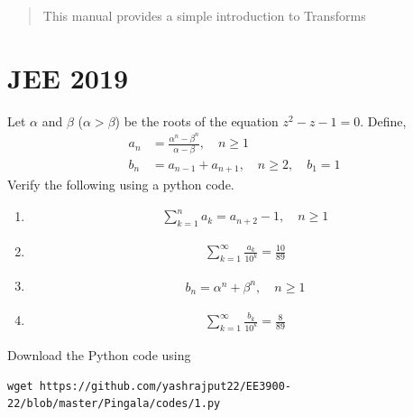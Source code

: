\documentclass[journal,12pt,twocolumn]{IEEEtran}
\renewcommand\thesection{\arabic{section}}
\begin{document}
% 







\maketitle


\tableofcontents

\bigskip

\begin{abstract}
This manual provides a simple introduction to Transforms
\end{abstract}
\section{JEE 2019}
\noindent Let $\alpha$ and $\beta$ ($\alpha > \beta$) be the roots of the
equation $z^2 - z - 1 = 0$. Define,
\begin{align}
	a_n &= \frac{\alpha^{n}-\beta^{n}}{\alpha - \beta}, \quad n \ge 1
	\\
	b_n &= a_{n-1} + a_{n+1}, \quad n \ge 2, \quad b_1 =1
	\label{eq:10-orig-diff}
\end{align}
Verify the following using a python code.
\begin{enumerate}[label=\thesection.\arabic*
,ref=\thesection.\theenumi]
\item 
\begin{align}
	\sum_{k=1}^{n}a_k = a_{n+2}-1, \quad n \ge 1
\end{align}
 \item 
\begin{align}
	\sum_{k=1}^{\infty}\frac{a_k}{10^k} =\frac{10}{89}
\end{align}
 \item 
\begin{align}
	b_n =\alpha^n + \beta^n, \quad n \ge 1
\end{align}
 \item 
\begin{align}
	\sum_{k=1}^{\infty}\frac{b_k}{10^k} =\frac{8}{89}
\end{align}
\end{enumerate}
Download the Python code using
\begin{lstlisting}
wget https://github.com/yashrajput22/EE3900-22/blob/master/Pingala/codes/1.py
\end{lstlisting}
\end{document}
